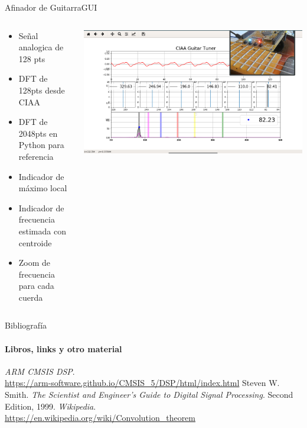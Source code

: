 \begin{frame}[t]{Afinador de Guitarra}{GUI}
   \footnotesize
   \begin{columns}
      \begin{column}{.3\textwidth}
         \begin{itemize}
            \item{Señal analogica de 128 pts}
            \item{DFT de 128pts desde CIAA}
            \item{DFT de 2048pts en Python para referencia}
            \item{Indicador de máximo local}
            \item{Indicador de frecuencia estimada con centroide}
            \item{Zoom de frecuencia para cada cuerda}
         \end{itemize}
      \end{column}
      \begin{column}{.7\textwidth}
       \href{run:./7_clase/demo.mp4}{
         \includegraphics[width=1.0\textwidth]{7_clase/tuner2}
       }
      \end{column}
   \end{columns}
   \vfill
   \note{
      \begin{itemize}
         \item{}
         \item{}
      \end{itemize}
   }
\end{frame}
\begin{frame}{Bibliografía}
   \framesubtitle{Libros, links y otro material}
   \begin{thebibliography}{9}
         \emph{ARM CMSIS DSP}. \\
         \href {https://arm-software.github.io/CMSIS_5/DSP/html/index.html}{https://arm-software.github.io/CMSIS\_5/DSP/html/index.html}
         Steven W. Smith.
         \emph{The Scientist and Engineer's Guide to Digital Signal Processing}.
         Second Edition, 1999.
         \emph{Wikipedia}. \\
         \href {https://en.wikipedia.org/wiki/Convolution\_theorem}{https://en.wikipedia.org/wiki/Convolution\_theorem}
   \end{thebibliography}
\end{frame}
